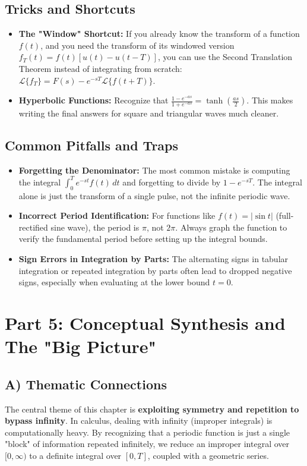 \documentclass[11pt, letterpaper]{article}
\theoremstyle{definition}
\theoremstyle{remark}
\begin{document}
\subsection{Tricks and Shortcuts}
\begin{itemize}
    \item \textbf{The "Window" Shortcut:} If you already know the transform of a function $f(t)$, and you need the transform of its windowed version $f_T(t) = f(t)[u(t) - u(t-T)]$, you can use the Second Translation Theorem instead of integrating from scratch: $\mathcal{L}\{f_T\} = F(s) - e^{-sT}\mathcal{L}\{f(t+T)\}$.
    \item \textbf{Hyperbolic Functions:} Recognize that $\frac{1 - e^{-as}}{1 + e^{-as}} = \tanh\left(\frac{as}{2}\right)$. This makes writing the final answers for square and triangular waves much cleaner.
\end{itemize}

\subsection{Common Pitfalls and Traps}
\begin{itemize}
    \item \textbf{Forgetting the Denominator:} The most common mistake is computing the integral $\int_0^T e^{-st} f(t) \, dt$ and forgetting to divide by $1 - e^{-sT}$. The integral alone is just the transform of a single pulse, not the infinite periodic wave.
    \item \textbf{Incorrect Period Identification:} For functions like $f(t) = |\sin t|$ (full-rectified sine wave), the period is $\pi$, not $2\pi$. Always graph the function to verify the fundamental period before setting up the integral bounds.
    \item \textbf{Sign Errors in Integration by Parts:} The alternating signs in tabular integration or repeated integration by parts often lead to dropped negative signs, especially when evaluating at the lower bound $t=0$.
\end{itemize}

\newpage
\section{Part 5: Conceptual Synthesis and The "Big Picture"}

\subsection{A) Thematic Connections}
The central theme of this chapter is \textbf{exploiting symmetry and repetition to bypass infinity}. In calculus, dealing with infinity (improper integrals) is computationally heavy. By recognizing that a periodic function is just a single "block" of information repeated infinitely, we reduce an improper integral over $[0, \infty)$ to a definite integral over $[0, T]$, coupled with a geometric series. 
\end{document}
